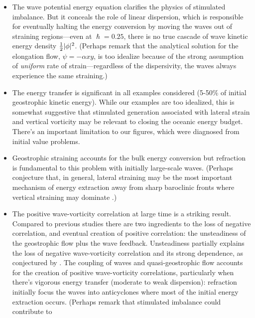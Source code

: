 \documentclass{jfm}
\begin{document}
\begin{itemize}
  \item The wave potential energy equation clarifies the physics of stimulated
        imbalance. But it conceals the role of linear dispersion, which is responsible
        for eventually halting the energy conversion by moving the waves out of
        straining regions---even at $\hslash=0.25$, there is no true cascade of
        wave kinetic energy density $\tfrac{1}{2} |\phi|^2$. (Perhaps remark that the
        analytical solution for the elongation flow, $\psi=-\alpha x y$, is too
        idealize because of the strong assumption of \textit{uniform} rate of
        strain---regardless of the dispersivity, the waves always experience the
        same straining.)
  \item The energy transfer is significant in all examples considered (5-50$\%$
        of initial geostrophic kinetic energy). While our examples are too idealized,
        this is somewhat suggestive that stimulated generation associated with lateral
        strain and vertical vorticity may be relevant to closing the oceanic energy
        budget. There's an important limitation to our figures, which were diagnosed
        from initial value problems.
  \item Geostrophic straining accounts for the bulk energy conversion but refraction
        is fundamental to this problem with initially large-scale waves. (Perhaps
        conjecture that, in general, lateral straining may be the most important mechanism
        of energy extraction away from sharp baroclinic fronts where vertical straining
        may dominate \citep{shakespeare_hogg2017}.)
  \item The positive wave-vorticity correlation at large time is a striking result.
        Compared to previous studies
        there are two ingredients to the loss of negative correlation, and eventual
        creation of positive correlation: the unsteadiness of the geostrophic flow
        plus the wave feedback. Unsteadiness partially explains the loss of negative
        wave-vorticity correlation and its strong dependence, as conjectured by \cite{danioux_etal2015}.
        The coupling of waves and quasi-geostrophic flow accounts for the creation of
        positive wave-vorticity correlations, particularly when there's vigorous
        energy transfer (moderate to weak dispersion): refraction initially focus the waves
        into anticyclones where most of the initial energy extraction occurs.
        (Perhaps remark that stimulated imbalance could contribute to

\end{itemize}
\end{document}
